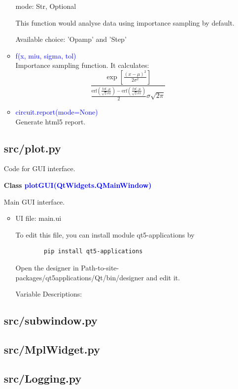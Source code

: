 \documentclass[12pt,a4paper]{article}
\begin{document}
\begin{itemize}[leftmargin=*]
\begin{itemize}
        mode: Str, Optional\par
        \quad This function would analyse data using importance sampling by default.

        \quad Available choice: 'Opamp' and 'Step'

    \item \textcolor{blue}{f(x, miu, sigma, tol)}\\
        Importance sampling function. It calculates:
        \begin{equation*}
            \frac{\exp\left [\frac{(x-\mu)^2}{2\sigma^2}\right ]}{\frac{\text{erf}(\frac{tol\cdot\mu}{\sqrt{2}\sigma\pi})-\text{erf}(\frac{tol\cdot\mu}{\sqrt{2}\sigma\pi})}{2}\sigma\sqrt{2\pi}}
        \end{equation*}

    \item \textcolor{blue}{circuit.report(mode=None)}\\
        Generate html5 report.
\end{itemize}

\subsection{src/plot.py}
Code for GUI interface.

\textbf{Class \textcolor{blue}{plotGUI(QtWidgets.QMainWindow)}}

Main GUI interface.

\begin{itemize}
    \item UI file: main.ui\par
        To edit this file, you can install module qt5-applications by
        \begin{lstlisting}
        pip install qt5-applications
        \end{lstlisting}

        Open the designer in Path-to-site-packages/qt5\textunderscore applications/Qt/bin/designer and edit it.

        Variable Descriptions:

\end{itemize}

\subsection{src/\textunderscore subwindow.py}

\subsection{src/MplWidget.py}

\subsection{src/Logging.py}


\end{itemize}
\end{document}
